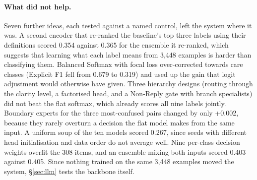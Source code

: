 \paragraph{What did not help.}
Seven further ideas, each tested against a named control, left the system where it was.
A second encoder that re-ranked the baseline's top three labels using their definitions
scored 0.354 against 0.365 for the ensemble it re-ranked, which suggests that learning
what each label means from 3,448 examples is harder than classifying them. Balanced
Softmax with focal loss \citep{ren2020balanced,lin2017focal} over-corrected towards rare
classes (Explicit F1 fell from 0.679 to 0.319) and used up the gain that logit adjustment
would otherwise have given. Three hierarchy designs (routing through the clarity level, a
factorised head, and a Non-Reply gate with branch specialists) did not beat the flat
softmax, which already scores all nine labels jointly. Boundary experts for the three
most-confused pairs changed \Stwo{} by only +0.002, because they rarely overturn a decision
the flat model makes from the same input. A uniform soup of the ten models scored 0.267,
since seeds with different head initialisation and data order do not average well. Nine
per-class decision weights overfit the 308 items, and an ensemble mixing both inputs scored
0.403 against 0.405. Since nothing trained on the same 3,448 examples moved the system,
\S\ref{sec:llm} tests the backbone itself.
